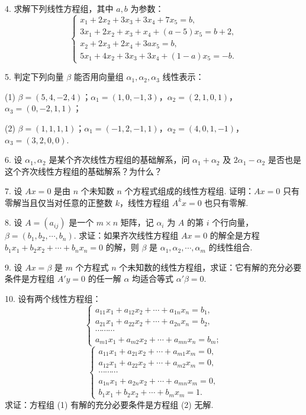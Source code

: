 \documentclass[UTF8, 12pt, fontset=fandol, oneside]{ctexart}
\begin{document}
4. 求解下列线性方程组，其中 $a,b$ 为参数：
\[
\left\{\begin{array}{r}
x_1+2x_2+3x_3+3x_4+7x_5=b,\\
3x_1+2x_2+x_3+x_4+(a-5)x_5=b+2,\\
x_2+2x_3+2x_4+3ax_5=b,\\
5x_1+4x_2+3x_3+3x_4+(1-a)x_5=-b.
\end{array}\right.
\]

5. 判定下列向量 $\beta$ 能否用向量组 $\alpha_1,\alpha_2,\alpha_3$ 线性表示：

(1) $\beta=(5,4,-2,4)$；$\alpha_1=(1,0,-1,3)$，$\alpha_2=(2,1,0,1)$，$\alpha_3=(0,-2,1,1)$；

(2) $\beta=(1,1,1,1)$；$\alpha_1=(-1,2,-1,1)$，$\alpha_2=(4,0,1,-1)$，$\alpha_3=(3,2,0,0)$.

6. 设 $\alpha_1,\alpha_2$ 是某个齐次线性方程组的基础解系，问 $\alpha_1+\alpha_2$ 及 $2\alpha_1-\alpha_2$ 是否也是这个齐次线性方程组的基础解系？为什么？

7. 设 $Ax=0$ 是由 $n$ 个未知数 $n$ 个方程式组成的线性方程组. 证明：$Ax=0$ 只有零解当且仅当对任意的正整数 $k$，线性方程组 $A^kx=0$ 也只有零解.

8. 设 $A=(a_{ij})$ 是一个 $m\times n$ 矩阵，记 $\alpha_i$ 为 $A$ 的第 $i$ 个行向量，$\beta=(b_1,b_2,\cdots,b_n)$. 求证：如果齐次线性方程组 $Ax=0$ 的解全是方程 $b_1x_1+b_2x_2+\cdots+b_nx_n=0$ 的解，则 $\beta$ 是 $\alpha_1,\alpha_2,\cdots,\alpha_m$ 的线性组合.

9. 设 $Ax=\beta$ 是 $m$ 个方程式 $n$ 个未知数的线性方程组，求证：它有解的充分必要条件是方程组 $A'y=0$ 的任一解 $\alpha$ 均适合等式 $\alpha'\beta=0$.

10. 设有两个线性方程组：
\[
\left\{\begin{array}{c}
a_{11}x_1+a_{12}x_2+\cdots+a_{1n}x_n=b_1,\\
a_{21}x_1+a_{22}x_2+\cdots+a_{2n}x_n=b_2,\\
\cdots\cdots\cdots\\
a_{m1}x_1+a_{m2}x_2+\cdots+a_{mn}x_n=b_m;
\end{array}\right.
\tag{1}
\]
\[
\left\{\begin{array}{c}
a_{11}x_1+a_{21}x_2+\cdots+a_{m1}x_m=0,\\
a_{12}x_1+a_{22}x_2+\cdots+a_{m2}x_m=0,\\
\cdots\cdots\cdots\\
a_{1n}x_1+a_{2n}x_2+\cdots+a_{mn}x_m=0,\\
b_1x_1+b_2x_2+\cdots+b_mx_m=1.
\end{array}\right.
\tag{2}
\]
求证：方程组 (1) 有解的充分必要条件是方程组 (2) 无解.
\end{document}
